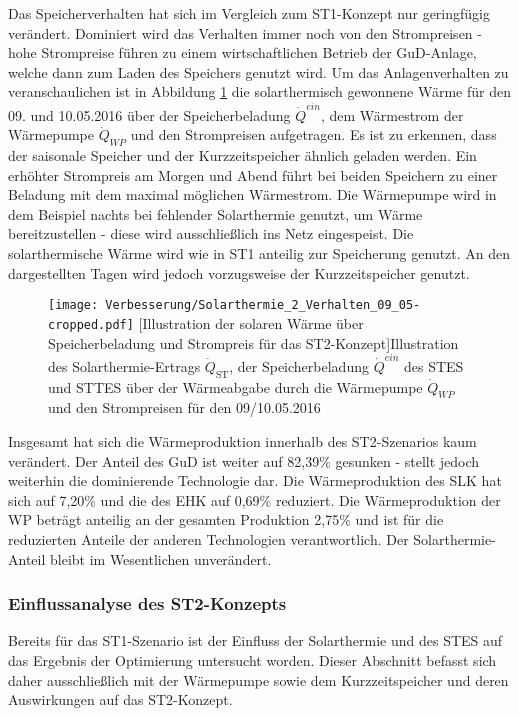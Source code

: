 Das Speicherverhalten hat sich im Vergleich zum ST1-Konzept nur geringfügig verändert. Dominiert wird das Verhalten immer noch von den Strompreisen - hohe Strompreise führen zu einem wirtschaftlichen Betrieb der \ac{GuD}-Anlage, welche dann zum Laden des Speichers genutzt wird. Um das Anlagenverhalten zu veranschaulichen ist in Abbildung \ref{figure: Verhalten_Solarthermie2} die solarthermisch gewonnene Wärme für den 09. und 10.05.2016 über der Speicherbeladung $\dot{Q}^{ein}$, dem Wärmestrom der Wärmepumpe $\dot{Q}_{WP}$ und den Strompreisen aufgetragen. Es ist zu erkennen, dass der saisonale Speicher und der Kurzzeitspeicher ähnlich geladen werden. Ein erhöhter Strompreis am Morgen und Abend führt bei beiden Speichern zu einer Beladung mit dem maximal möglichen Wärmestrom. Die Wärmepumpe wird in dem Beispiel nachts bei fehlender Solarthermie genutzt, um Wärme bereitzustellen - diese wird ausschließlich ins Netz eingespeist. Die solarthermische Wärme wird wie in ST1 anteilig zur Speicherung genutzt. An den dargestellten Tagen wird jedoch vorzugsweise der Kurzzeitspeicher genutzt. 
	\begin{figure}
		\centering
		\texttt{[image: Verbesserung/Solarthermie\_2\_Verhalten\_09\_05-cropped.pdf]}
		[Illustration der solaren Wärme über Speicherbeladung und Strompreis für das ST2-Konzept]{Illustration des Solarthermie-Ertrags $\dot{Q}_\text{ST}$, der Speicherbeladung $\dot{Q}^{ein}$ des \ac{STES} und \ac{STTES} über der Wärmeabgabe durch die Wärmepumpe $\dot{Q}_{WP}$ und den Strompreisen für den 09/10.05.2016}
		\label{figure: Verhalten_Solarthermie2}
	\end{figure}

Insgesamt hat sich die Wärmeproduktion innerhalb des ST2-Szenarios kaum verändert. Der Anteil des \ac{GuD} ist weiter auf 82,39\% gesunken - stellt jedoch weiterhin die dominierende Technologie dar. Die Wärmeproduktion des \ac{SLK} hat sich auf 7,20\%  und die des \ac{EHK} auf 0,69\% reduziert. Die Wärmeproduktion der \ac{WP} beträgt anteilig an der gesamten Produktion 2,75\% und ist für die reduzierten Anteile der anderen Technologien verantwortlich. Der Solarthermie-Anteil bleibt im Wesentlichen unverändert.

\subsubsection*{Einflussanalyse des ST2-Konzepts}
Bereits für das ST1-Szenario ist der Einfluss der Solarthermie und des \ac{STES} auf das Ergebnis der Optimierung untersucht worden. Dieser Abschnitt befasst sich daher ausschließlich mit der Wärmepumpe sowie dem Kurzzeitspeicher und deren Auswirkungen auf das ST2-Konzept.

